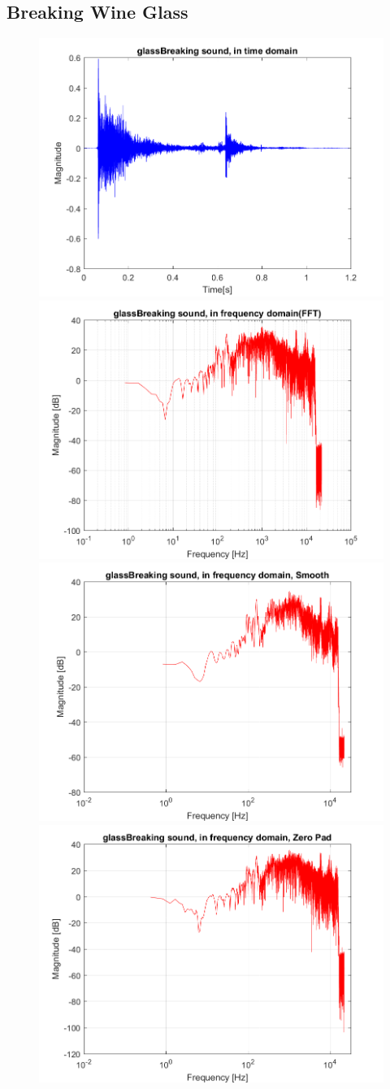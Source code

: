 \subsection{Breaking Wine Glass}

\begin{figure}[htb]
	\centering
	{\includegraphics[width=0.45\linewidth]{code/glassBreaking_figure1.png}}
	{\includegraphics[width=0.45\linewidth]{code/glassBreaking_figure2.png}}
	{\includegraphics[width=0.45\linewidth]{code/glassBreaking_figure3.png}}
	{\includegraphics[width=0.45\linewidth]{code/glassBreaking_figure4.png}}

\end{figure}
